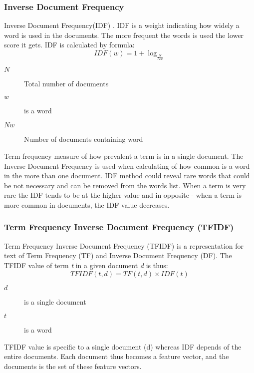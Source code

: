 \subsubsection{Inverse Document Frequency}
Inverse Document Frequency(IDF) \cite{BIB2}. IDF is a weight indicating how widely a word is used in the documents. The more frequent the words is used the lower score it gets. IDF is calculated by formula:
\begin{equation}
IDF(w) = 1 + \log_\frac{N}{Nw}
\end{equation}
\begin{description}
    \item[$N$] Total number of documents
    \item[$w$] is a word
    \item[$Nw$] Number of documents containing word 
\end{description}
        
Term frequency measure of how prevalent a term is in a single document. The Inverse Document Frequency is used when calculating of how common is a word in the more than one document. IDF method could reveal rare words that could be not necessary and can be removed from the words list. When a term is very rare the IDF tends to be at the higher value and in opposite - when a term is more common in documents, the IDF value decreases.

\subsubsection{Term Frequency Inverse Document Frequency (TFIDF)}
Term Frequency Inverse Document Frequency (TFIDF) \cite{BIB1} is a representation for text of Term Frequency (TF) and Inverse Document Frequency (DF). The TFIDF value of term \textit{t} in a given document \textit{d} is thus:
\begin{equation}
        TFIDF(t, d) = TF(t, d) \times IDF(t)
\end{equation}
\begin{description}
    \item[$d$] is a single document
    \item[$t$] is a word
\end{description}

TFIDF value is specific to a single document (d) whereas IDF depends of the entire documents. Each document thus becomes a feature vector, and the documents is the set of these feature vectors. 

